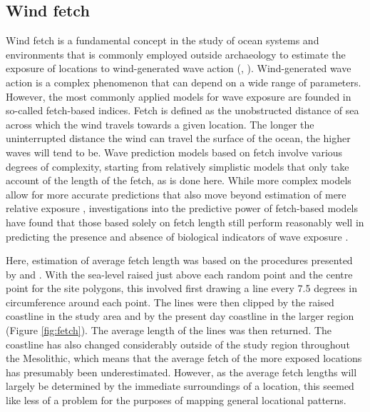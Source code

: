 \documentclass[12pt, a4paper]{article}
\begin{document}
\subsection{Wind fetch} 
Wind fetch is a fundamental concept in the study of ocean systems and environments that is commonly employed outside archaeology to estimate the exposure of locations to wind-generated wave action (\citealp[][]{laing1998}, \citealp[for archaeological applications see][]{nitter2013, nitter2018}). Wind-generated wave action is a complex phenomenon that can depend on a wide range of parameters. However, the most commonly applied models for wave exposure are founded in so-called fetch-based indices. Fetch is defined as the unobstructed distance of sea across which the wind travels towards a given location. The longer the uninterrupted distance the wind can travel the surface of the ocean, the higher waves will tend to be. Wave prediction models based on fetch involve various degrees of complexity, starting from relatively simplistic models that only take account of the length of the fetch, as is done here. While more complex models allow for more accurate predictions that also move beyond estimation of mere relative exposure \citep{malhotra2007, bekkby2008, sundblad2014}, investigations into the predictive power of fetch-based models have found that those based solely on fetch length still perform reasonably well in predicting the presence and absence of biological indicators of wave exposure \citep{burrows2008, hill2010}. \par
Here, estimation of average fetch length was based on the procedures presented by \cite{ekebom2003} and \cite{tolvanen2005}. With the sea-level raised just above each random point and the centre point for the site polygons, this involved first drawing a line every 7.5 degrees in circumference around each point. The lines were then clipped by the raised coastline in the study area and by the present day coastline in the larger region (Figure \ref{fig:fetch}). The average length of the lines was then returned. The coastline has also changed considerably outside of the study region throughout the Mesolithic, which means that the average fetch of the more exposed locations has presumably been underestimated. However, as the average fetch lengths will largely be determined by the immediate surroundings of a location, this seemed like less of a problem for the purposes of mapping general locational patterns. \par
\end{document}
